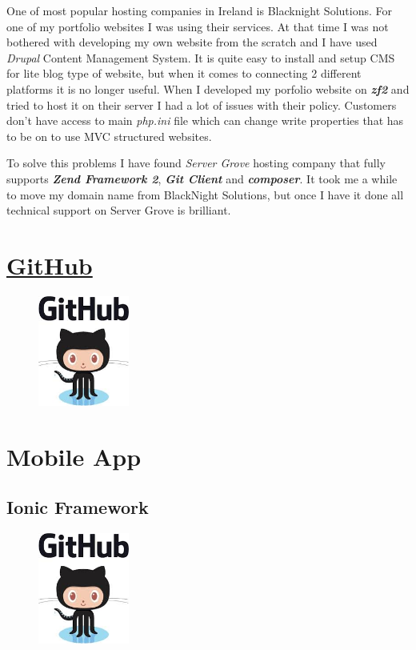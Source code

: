 One of most popular hosting companies in Ireland is Blacknight Solutions. For one of my portfolio websites I was using their services. At that time I was not bothered with developing my own website from the scratch and I have used \textit{Drupal} Content Management System. It is quite easy to install and setup CMS for lite blog type of website, but when it comes to connecting 2 different platforms it is no longer useful. When I developed my porfolio website on \textbf{\textit{zf2}} and tried to host it on their server I had a lot of issues with their policy. Customers don't have access to main \textit{php.ini} file which can change write properties that has to be on to use MVC structured websites. 

To solve this problems I have found \textit{Server Grove} hosting company that fully supports \textbf{\textit{Zend Framework 2}}, \textbf{\textit{Git Client}} and  \textbf{\textit{composer}}. It took me a while to move my domain name from BlackNight Solutions, but once I have it done all technical support on Server Grove is brilliant.



  \section{  \href{https://github.com}{GitHub}}
\begin{figure}
	\includegraphics[width=3cm]{img/zf2/github-logo.png}
\end{figure} 

  \section{Mobile App} %
\subsection{Ionic Framework}
\begin{figure}
\includegraphics[width=3cm]{img/zf2/github-logo.png}
\end{figure} 

